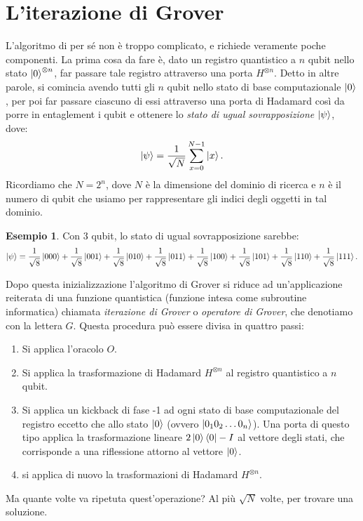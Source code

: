 \documentclass{book}
\theoremstyle{definition}
\theoremstyle{definition}
\theoremstyle{definition}
\newtheorem*{ex}{Esempio}
\theoremstyle{plain}
\theoremstyle{plain}
\theoremstyle{plain}
\theoremstyle{plain}
\begin{document}
\section{L'iterazione di Grover}
L'algoritmo di per sé non è troppo complicato, e richiede veramente poche componenti. La prima cosa da fare è, dato un registro quantistico a $n$ qubit nello stato $\ket{0}^{\otimes n}$, far passare tale registro attraverso una porta $H^{\otimes{n}}$. Detto in altre parole, si comincia avendo tutti gli $n$ qubit nello stato di base computazionale $\ket{0}$, per poi far passare ciascuno di essi attraverso una porta di Hadamard così da porre in entaglement i qubit e ottenere lo \emph{stato di ugual sovrapposizione} $\ket{\psi}$, dove:
\begin{displaymath}
\ket{\psi} = \frac{1}{\sqrt{N}}\sum_{x=0}^{N-1}\ket{x}.
\end{displaymath}
Ricordiamo che $N=2^{n}$, dove $N$ è la dimensione del dominio di ricerca e $n$ è il numero di qubit che usiamo per rappresentare gli indici degli oggetti in tal dominio.
\begin{ex}
Con 3 qubit, lo stato di ugual sovrapposizione sarebbe:
\begin{displaymath}
\ket{\psi} = \frac{1}{\sqrt{8}}\ket{000} + \frac{1}{\sqrt{8}}\ket{001} + \frac{1}{\sqrt{8}}\ket{010} + \frac{1}{\sqrt{8}}\ket{011} + \frac{1}{\sqrt{8}}\ket{100} + \frac{1}{\sqrt{8}}\ket{101} + \frac{1}{\sqrt{8}}\ket{110} + \frac{1}{\sqrt{8}}\ket{111} .
\end{displaymath}
\end{ex}
Dopo questa inizializzazione l'algoritmo di Grover si riduce ad un'applicazione reiterata di una funzione quantistica (funzione intesa come subroutine informatica) chiamata \emph{iterazione di Grover} o \emph{operatore di Grover}, che denotiamo con la lettera $G$. Questa procedura può essere divisa in quattro passi:
\begin{enumerate}
    \item Si applica l'oracolo $O$.
    \item Si applica la trasformazione di Hadamard $H^{\otimes n}$ al registro quantistico a $n$ qubit.
    \item Si applica un kickback di fase -1 ad ogni stato di base computazionale del registro eccetto che allo stato $\ket{0}$ (ovvero $\ket{0_1 0_2 \dots 0_n}$). Una porta di questo tipo applica la trasformazione lineare $2\ket{0} \bra{0} - I$ al vettore degli stati, che corrisponde a una riflessione attorno al vettore $\ket{0}$.
    \item si applica di nuovo la trasformazioni di Hadamard $H^{\otimes n}$.
\end{enumerate}
Ma quante volte va ripetuta quest'operazione? Al più $\sqrt{N}$ volte, per trovare una soluzione.
\end{document}
